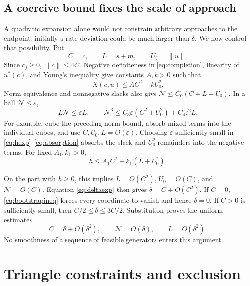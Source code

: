 \documentclass[11pt,a4paper]{article}
\newcommand{\av}[1]{\overline{#1}}
\newcommand{\Nloc}{\mathcal N}
\begin{document}
\subsection{A coercive bound fixes the scale of approach}\label{sec:bootstrap}

A quadratic expansion alone would not constrain arbitrary approaches to
the endpoint: initially a rate deviation could be much larger than
$\delta$. We now control that possibility. Put
\begin{equation}
 C=\av c,\qquad L=\av s+m,\qquad U_0=\|u\|.
\end{equation}
Since $c_j\geq0$, $\|c\|\leq4C$. Negative definiteness in
\eqref{eq:completion}, linearity of $u^*(c)$, and Young's inequality
give constants $A,k>0$ such that
\begin{equation}\label{eq:coerciveK}
 K(c,u)\leq AC^2-kU_0^2.
\end{equation}
Norm equivalence and nonnegative slacks also give
$\Nloc\leq C_0(C+L+U_0)$. In a ball $\Nloc\leq\varepsilon$,
\begin{equation}\label{eq:absorption}
 L\Nloc\leq\varepsilon L,\qquad
 \Nloc^3\leq C_3\varepsilon(C^2+U_0^2)
                   +C_4\varepsilon^2L.
\end{equation}
For example, cube the preceding norm bound, absorb mixed terms into
the individual cubes, and use $C,U_0,L=O(\varepsilon)$.
Choosing $\varepsilon$ sufficiently small in
\eqref{eq:hexp}--\eqref{eq:absorption} absorbs the slack and $U_0^2$
remainders into the negative terms. For fixed $A_1,k_1>0$,
\begin{equation}\label{eq:bootstrapineq}
 h\leq A_1C^2-k_1(L+U_0^2).
\end{equation}

On the part with $h\geq0$, this implies
$L=O(C^2)$, $U_0=O(C)$, and $\Nloc=O(C)$. Equation
\eqref{eq:deltaexp} then gives $\delta=C+O(C^2)$.
If $C=0$, \eqref{eq:bootstrapineq} forces every coordinate to vanish
and hence $\delta=0$. If $C>0$ is sufficiently small, then
$C/2\leq\delta\leq3C/2$. Substitution proves the uniform estimates
\begin{equation}\label{eq:bootstrap}
 C=\delta+O(\delta^2),\qquad
 \Nloc=O(\delta),\qquad L=O(\delta^2).
\end{equation}
No smoothness of a sequence of feasible generators enters this argument.

\section{Triangle constraints and exclusion}\label{sec:exclusion}
\end{document}
